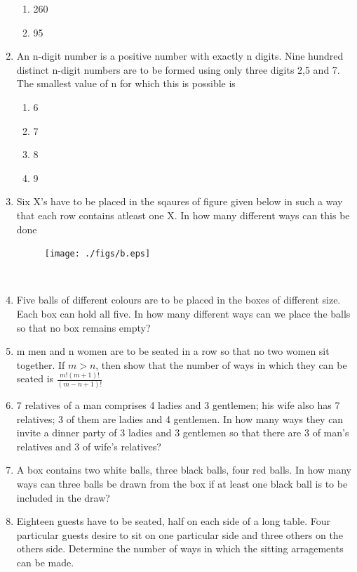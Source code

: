 \begin{enumerate}[label=\arabic*.,ref=\thesubsection.\theenumi]
\begin{enumerate}
\item 260
\item 95\\
\end{enumerate}
\item An n-digit number is a positive number with exactly n digits. Nine hundred distinct n-digit numbers are to be formed using only three digits 2,5 and 7. The smallest value of n for which this is possible is
\begin{enumerate}
\item 6
\item 7
\item 8
\item 9\\
\end{enumerate}
\item Six X's have to be placed in the sqaures of figure given below in such a way that each row contains atleast one X. In how many different ways can this be done
\begin{figure}
	\texttt{[image: ./figs/b.eps]} 
\end{figure}\\
\item Five balls of different colours are to be placed in the boxes of different size. Each box can hold all five. In how many different ways can we place the balls so that no box remains empty?\\
\item m men and n women are to be seated in a row so that no two women sit together. If $m>n$, then show that the number of ways in which they can be seated is $\frac{m!(m+1)!}{(m-n+1)!}$\\
\item 7 relatives of a man comprises 4 ladies and 3 gentlemen; his wife also has 7 relatives; 3 of them are ladies and 4 gentlemen. In how many ways they can invite a dinner party of 3 ladies and 3 gentlemen so that there are 3 of man's relatives and 3 of wife's relatives?\\
\item A box contains two white balls, three black balls, four red balls. In how many ways can three balls be drawn from the box if at least one black ball is to be included in the draw?\\
\item Eighteen guests have to be seated, half on each side of a long table. Four particular guests desire to sit on one particular side and three others on the others side. Determine the number of ways in which the sitting arragements can be made.\\

\end{enumerate}
